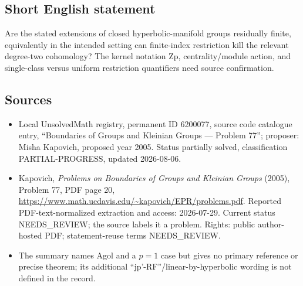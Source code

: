 \documentclass[11pt]{article}
\begin{document}
\subsection{Short English statement}
Are the stated extensions of closed hyperbolic-manifold groups residually finite, equivalently in the intended setting can finite-index restriction kill the relevant degree-two cohomology? The kernel notation Zp, centrality/module action, and single-class versus uniform restriction quantifiers need source confirmation.
\subsection{Sources}
\begin{itemize}
\item Local UnsolvedMath registry, permanent ID 6200077, source code catalogue entry, ``Boundaries of Groups and Kleinian Groups --- Problem 77''; proposer: Misha Kapovich, proposed year 2005. Status partially solved, classification PARTIAL-PROGRESS, updated 2026-08-06.
\item Kapovich, \emph{Problems on Boundaries of Groups and Kleinian Groups} (2005), Problem 77, PDF page 20, \url{https://www.math.ucdavis.edu/~kapovich/EPR/problems.pdf}. Reported PDF-text-normalized extraction and access: 2026-07-29. Current status NEEDS\_REVIEW; the source labels it a problem. Rights: public author-hosted PDF; statement-reuse terms NEEDS\_REVIEW.
\item The summary names Agol and a $p=1$ case but gives no primary reference or precise theorem; its additional ``jp'-RF''/linear-by-hyperbolic wording is not defined in the record.
\end{itemize}
\end{document}

